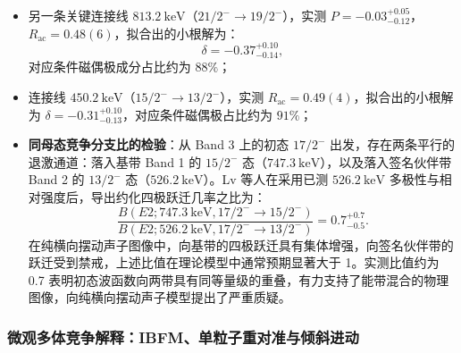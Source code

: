\begin{enumerate}
\begin{itemize}
在此小根解下，条件换算出的磁偶极辐射成分占比约为 $82\%$，电四极成分仅约 $18\%$；
\item 另一条关键连接线 $813.2\ \mathrm{keV}$（$21/2^- \to 19/2^-$），实测 $P = -0.03_{-0.12}^{+0.05}$，$R_{\mathrm{ac}} = 0.48(6)$，拟合出的小根解为：
\begin{equation}\label{eq:4-4-pr135-small-delta-813}
\delta = -0.37_{-0.14}^{+0.10},
\end{equation}
对应条件磁偶极成分占比约为 $88\%$；
\item 连接线 $450.2\ \mathrm{keV}$（$15/2^- \to 13/2^-$），实测 $R_{\mathrm{ac}} = 0.49(4)$，拟合出的小根解为 $\delta = -0.31_{-0.13}^{+0.10}$，对应条件磁偶极占比约为 $91\%$；
\item \textbf{同母态竞争分支比的检验}：从 Band 3 上的初态 $17/2^-$ 出发，存在两条平行的退激通道：落入基带 Band 1 的 $15/2^-$ 态（$747.3\ \mathrm{keV}$），以及落入签名伙伴带 Band 2 的 $13/2^-$ 态（$526.2\ \mathrm{keV}$）。Lv 等人在采用已测 $526.2\ \mathrm{keV}$ 多极性与相对强度后，导出约化四极跃迁几率之比为：
\begin{equation}\label{eq:4-4-pr135-branch-ratio}
\frac{B(E2; 747.3\ \mathrm{keV}, 17/2^- \to 15/2^-)}{B(E2; 526.2\ \mathrm{keV}, 17/2^- \to 13/2^-)} = 0.7_{-0.5}^{+0.7}.
\end{equation}
在纯横向摆动声子图像中，向基带的四极跃迁具有集体增强，向签名伙伴带的跃迁受到禁戒，上述比值在理论模型中通常预期显著大于 1。实测比值约为 0.7 表明初态波函数向两带具有同等量级的重叠，有力支持了能带混合的物理图像，向纯横向摆动声子模型提出了严重质疑。
\end{itemize}
\end{enumerate}

\subsubsection{微观多体竞争解释：IBFM、单粒子重对准与倾斜进动}

